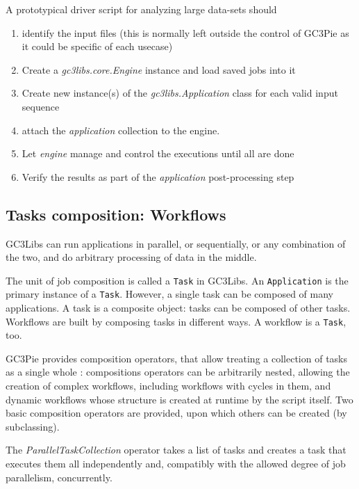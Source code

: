\documentclass{PoS}
\begin{document}
A prototypical driver script for analyzing large data-sets should
\begin{enumerate}
  \item identify the input files (this is normally left outside the
    control of GC3Pie as it could be specific of each usecase)
  \item Create a \emph{gc3libs.core.Engine} instance and load saved
    jobs into it
  \item Create new instance(s) of the \emph{gc3libs.Application} class
    for each valid input sequence 
  \item attach the \emph{application} collection to the engine.
  \item Let \emph{engine} manage and control the executions until all
    are done
  \item Verify the results as part of the \emph{application}
    post-processing step
\end{enumerate}

\subsection{Tasks composition: Workflows}
\label{sec:gc3pie-wkf}
GC3Libs can run applications in parallel, or sequentially, or any
combination of the two, and do arbitrary processing of data in the
middle.

The unit of job composition is called a \texttt{Task} in GC3Libs. An
\texttt{Application} is the primary instance of a
\texttt{Task}. However, a single task can be composed of many
applications. A task is a composite object: tasks can be composed of
other tasks. Workflows are built by composing tasks in different
ways. A workflow is a \texttt{Task}, too.

GC3Pie provides composition operators, that allow treating a
collection of tasks as a single whole
\cite{gc3pie-euroscipy2011-poster}: compositions operators can be
arbitrarily nested, allowing the creation of complex workflows,
including workflows with cycles in them, and dynamic workflows whose
structure is created at runtime by the script itself. Two basic
composition operators are provided, upon which others can be created
(by subclassing).


The \emph{ParallelTaskCollection} operator takes a list of tasks and
creates a task that executes them all independently and, compatibly
with the allowed degree of job parallelism, concurrently.
\end{document}

